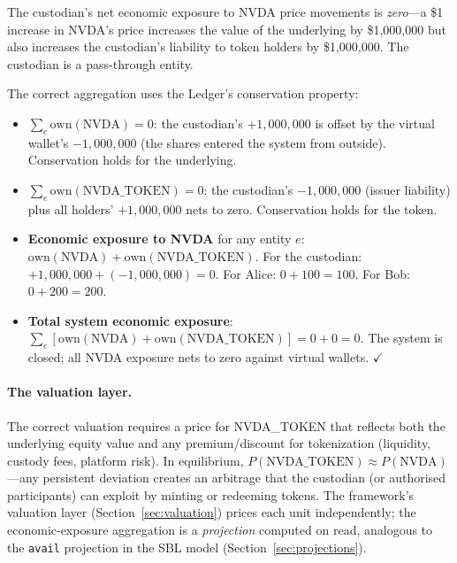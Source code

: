 \documentclass[11pt,a4paper]{article}
\begin{document}
\noindent The custodian's net economic exposure to NVDA price movements is \emph{zero}---a \$1 increase in NVDA's price increases the value of the underlying by \$1{,}000{,}000 but also increases the custodian's liability to token holders by \$1{,}000{,}000. The custodian is a pass-through entity.

The correct aggregation uses the Ledger's conservation property:

\begin{itemize}[nosep]
\item $\sum_e \text{own}(\text{NVDA}) = 0$: the custodian's $+1{,}000{,}000$ is offset by the virtual wallet's $-1{,}000{,}000$ (the shares entered the system from outside). Conservation holds for the underlying.
\item $\sum_e \text{own}(\text{NVDA\_TOKEN}) = 0$: the custodian's $-1{,}000{,}000$ (issuer liability) plus all holders' $+1{,}000{,}000$ nets to zero. Conservation holds for the token.
\item \textbf{Economic exposure to NVDA} for any entity $e$: $\text{own}(\text{NVDA}) + \text{own}(\text{NVDA\_TOKEN})$. For the custodian: $+1{,}000{,}000 + (-1{,}000{,}000) = 0$. For Alice: $0 + 100 = 100$. For Bob: $0 + 200 = 200$.
\item \textbf{Total system economic exposure}: $\sum_e [\text{own}(\text{NVDA}) + \text{own}(\text{NVDA\_TOKEN})] = 0 + 0 = 0$. The system is closed; all NVDA exposure nets to zero against virtual wallets. $\checkmark$
\end{itemize}

\paragraph{The valuation layer.} The correct valuation requires a price for NVDA\_TOKEN that reflects both the underlying equity value and any premium/discount for tokenization (liquidity, custody fees, platform risk). In equilibrium, $P(\text{NVDA\_TOKEN}) \approx P(\text{NVDA})$---any persistent deviation creates an arbitrage that the custodian (or authorised participants) can exploit by minting or redeeming tokens. The framework's valuation layer (Section~\ref{sec:valuation}) prices each unit independently; the economic-exposure aggregation is a \emph{projection} computed on read, analogous to the \texttt{avail} projection in the SBL model (Section~\ref{sec:projections}).
\end{document}
